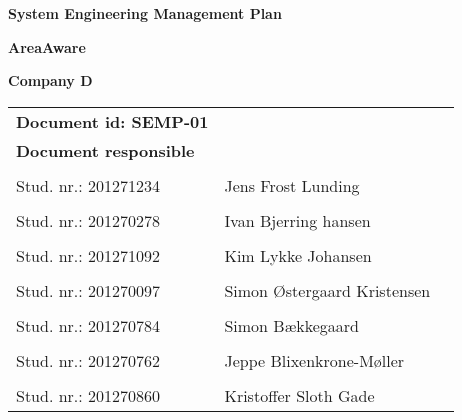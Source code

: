 
\centerline{\Huge\bfseries\color{ThemeColor} System Engineering Management Plan} 

\vspace{1em}
\centerline{\Large\bfseries\color{BlackColor} AreaAware} 

\vspace{5em}
\centerline{\large\bfseries\color{BlackColor}Company D} 




\begin{center}
   \begin{tabular}{ l l p{6cm} }
   \textbf{Document id: SEMP-01}& & \\
   \textbf{Document responsible}& & \\
   & & \\
   Stud. nr.: 201271234 & Jens Frost Lunding & \\\hline
   & & \\
   Stud. nr.: 201270278 & Ivan Bjerring hansen & \\\hline
   & & \\
   Stud. nr.: 201271092 & Kim Lykke Johansen & \\\hline
   & & \\  
   Stud. nr.: 201270097 & Simon Østergaard Kristensen & \\\hline
   & & \\
   Stud. nr.: 201270784  & Simon Bækkegaard & \\\hline
   & & \\
   Stud. nr.:  201270762 & Jeppe Blixenkrone-Møller & \\\hline
   & & \\
   Stud. nr.:  201270860 & Kristoffer Sloth Gade & \\\hline
   \end{tabular}       
\end{center}
\thispagestyle{empty} %
\restoregeometry

